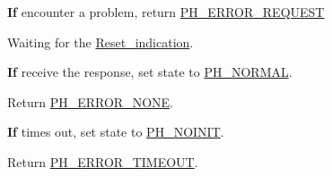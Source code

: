 {\bfseries If} encounter a problem, return \hyperlink{group___p_h___error___code_ga76393e5665e76130e95c73aab378c53d}{P\+H\+\_\+\+E\+R\+R\+O\+R\+\_\+\+R\+E\+Q\+U\+E\+ST}

Waiting for the \hyperlink{group___u_a_r_t___control___from_gade9c58399a01abdaa03bbecbf63879c3}{Reset\+\_\+indication}.

{\bfseries If} receive the response, set state to \hyperlink{group___k_n_x___p_h___sup___exported___types_gga5b665a94bef912fbfbea7cc949ed0e49a4be7dd56ae47b708c6f4751714efe930}{P\+H\+\_\+\+N\+O\+R\+M\+AL}.

Return \hyperlink{group___p_h___error___code_ga67055c114ec03135c28e1cb6a3d68f5a}{P\+H\+\_\+\+E\+R\+R\+O\+R\+\_\+\+N\+O\+NE}.

{\bfseries If} times out, set state to \hyperlink{group___k_n_x___p_h___sup___exported___types_gga5b665a94bef912fbfbea7cc949ed0e49a329f30393c5729b777643b93478de68c}{P\+H\+\_\+\+N\+O\+I\+N\+IT}.

Return \hyperlink{group___p_h___error___code_gaae8d2172a18fdde6957c77af378c2574}{P\+H\+\_\+\+E\+R\+R\+O\+R\+\_\+\+T\+I\+M\+E\+O\+UT}. 